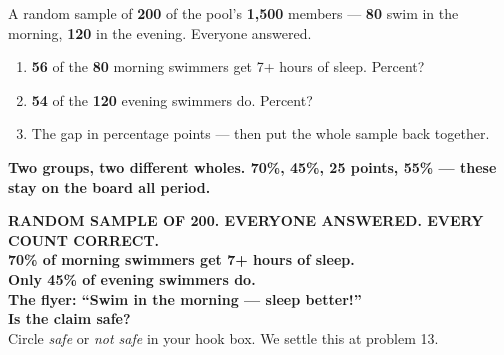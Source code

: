 \documentclass[aspectratio=169, 11pt]{beamer}
\begin{document}
\begin{frame}[t, plain]
  \vspace{0.3cm}
  \begin{center}
    \begin{minipage}{0.88\textwidth}
      A random sample of \textbf{200} of the pool's \textbf{1{,}500} members --- \textbf{80}
      swim in the morning, \textbf{120} in the evening. Everyone answered.
      \begin{enumerate}\setlength{\itemsep}{7pt}
        \item \textbf{56} of the \textbf{80} morning swimmers get 7+ hours of sleep. Percent?
        \item \textbf{54} of the \textbf{120} evening swimmers do. Percent?
        \item The gap in percentage points --- then put the whole sample back together.
      \end{enumerate}
    \end{minipage}
  \end{center}
  \vspace{0.35cm}
  \begin{center}
    {\color{cerulean}\bfseries Two groups, two different wholes. 70\%, 45\%, 25 points, 55\%
    --- these stay on the board all period.}
  \end{center}
\end{frame}

{
\begin{frame}[plain]
  \vspace{1.1cm}
  \begin{center}
    {\color{frostmid}\bfseries\small RANDOM SAMPLE OF 200. EVERYONE ANSWERED. EVERY COUNT CORRECT.}\\[0.7cm]
    {\color{white}\bfseries\Large 70\% of morning swimmers get 7+ hours of sleep.\\[0.25cm]
    Only 45\% of evening swimmers do.}\\[0.7cm]
    {\color{goldacc}\bfseries\large The flyer: ``Swim in the morning --- sleep better!''}\\[0.4cm]
    {\color{white}\bfseries\large Is the claim safe?}\\[0.35cm]
    {\color{frostmid}\small Circle \emph{safe} or \emph{not safe} in your hook box. We settle
    this at problem 13.}
  \end{center}
\end{frame}
}
\end{document}
